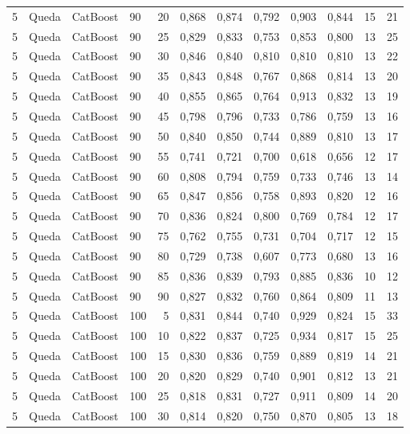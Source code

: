 \begin{longtable}{ccclrrrrrrrr}
5 & Queda & CatBoost & 90 & 20 & 0,868 & 0,874 & 0,792 & 0,903 & 0,844 & 15 & 21 \\
5 & Queda & CatBoost & 90 & 25 & 0,829 & 0,833 & 0,753 & 0,853 & 0,800 & 13 & 25 \\
5 & Queda & CatBoost & 90 & 30 & 0,846 & 0,840 & 0,810 & 0,810 & 0,810 & 13 & 22 \\
5 & Queda & CatBoost & 90 & 35 & 0,843 & 0,848 & 0,767 & 0,868 & 0,814 & 13 & 20 \\
5 & Queda & CatBoost & 90 & 40 & 0,855 & 0,865 & 0,764 & 0,913 & 0,832 & 13 & 19 \\
5 & Queda & CatBoost & 90 & 45 & 0,798 & 0,796 & 0,733 & 0,786 & 0,759 & 13 & 16 \\
5 & Queda & CatBoost & 90 & 50 & 0,840 & 0,850 & 0,744 & 0,889 & 0,810 & 13 & 17 \\
5 & Queda & CatBoost & 90 & 55 & 0,741 & 0,721 & 0,700 & 0,618 & 0,656 & 12 & 17 \\
5 & Queda & CatBoost & 90 & 60 & 0,808 & 0,794 & 0,759 & 0,733 & 0,746 & 13 & 14 \\
5 & Queda & CatBoost & 90 & 65 & 0,847 & 0,856 & 0,758 & 0,893 & 0,820 & 12 & 16 \\
5 & Queda & CatBoost & 90 & 70 & 0,836 & 0,824 & 0,800 & 0,769 & 0,784 & 12 & 17 \\
5 & Queda & CatBoost & 90 & 75 & 0,762 & 0,755 & 0,731 & 0,704 & 0,717 & 12 & 15 \\
5 & Queda & CatBoost & 90 & 80 & 0,729 & 0,738 & 0,607 & 0,773 & 0,680 & 13 & 16 \\
5 & Queda & CatBoost & 90 & 85 & 0,836 & 0,839 & 0,793 & 0,885 & 0,836 & 10 & 12 \\
5 & Queda & CatBoost & 90 & 90 & 0,827 & 0,832 & 0,760 & 0,864 & 0,809 & 11 & 13 \\
5 & Queda & CatBoost & 100 & 5 & 0,831 & 0,844 & 0,740 & 0,929 & 0,824 & 15 & 33 \\
5 & Queda & CatBoost & 100 & 10 & 0,822 & 0,837 & 0,725 & 0,934 & 0,817 & 15 & 25 \\
5 & Queda & CatBoost & 100 & 15 & 0,830 & 0,836 & 0,759 & 0,889 & 0,819 & 14 & 21 \\
5 & Queda & CatBoost & 100 & 20 & 0,820 & 0,829 & 0,740 & 0,901 & 0,812 & 13 & 21 \\
5 & Queda & CatBoost & 100 & 25 & 0,818 & 0,831 & 0,727 & 0,911 & 0,809 & 14 & 20 \\
5 & Queda & CatBoost & 100 & 30 & 0,814 & 0,820 & 0,750 & 0,870 & 0,805 & 13 & 18 \\

\end{longtable}
